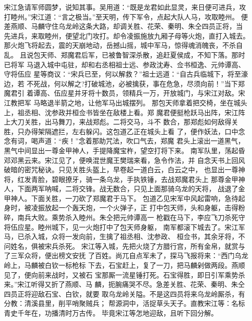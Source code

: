 宋江急请军师圆梦，说知其事。吴用道：“既是龙君如此显灵，来日便可进兵，攻
打睦州。”宋江道：“言之极当。”至天明，传下军令，点起大队人马，攻取睦州。
便差燕顺、马麟守住乌龙岭这条大路，却调关胜、花荣、秦明、朱仝四员正将，当
先进兵，来取睦州，便望北门攻打。却令凌振施放九厢子母等火炮，直打入城去。
那火炮飞将起去，震的天崩地动，岳撼山摇，城中军马，惊得魂消魄丧，不杀自乱。
且说包天师、郑魔君后军，已被鲁智深杀散，追赶夏侯成，不知下落。那时已将军
马退入城中屯驻，却和右丞相祖士远、参政沈寿、佥书桓逸、元帅谭高、守将伍应
星等商议：“宋兵已至，何以解救？”祖士远道：“自古兵临城下，将至濠边，若
不死战，何以解之?打破城池，必被擒获，事在危急，尽须向前！”当下郑魔君引
着谭高、伍应星并牙将十数员，领精兵一万，开放城门，与宋江对敌。宋江教把军
马略退半箭之地，让他军马出城摆列。
那包天师拿着把交椅，坐在城头上，祖丞相、沈参政并桓佥书皆坐在敌楼上看。郑
魔君便挺枪跃马出阵，宋江阵上大刀关胜，出马舞刀，来战郑彪。二将交马，斗不
数合，那郑彪如何敌得关胜，只办得架隔遮拦，左右躲闪。这包道乙正在城头上看
了，便作妖法，口中念念有词，喝声道：“疾！”念着那助咒法，吹口气去，郑魔
君头上滚出一道黑气，黑气中间显出一尊金甲神人，手提降魔宝杵，望空打将下来。
南军队里，荡起昏邓邓黑云来。宋江见了，便唤混世魔王樊瑞来看，急令作法，并
自念天书上回风破暗的密咒秘诀。只见关胜头盔上，早卷起一道白云，白云之中，
也显出一尊神将，红发青脸，碧眼撩牙，骑一条乌龙，手执铁锤，去战郑魔君头上
那尊金甲神人，下面两军呐喊，二将交锋。战无数合，只见上面那骑乌龙的天将，
战退了金甲神人。下面关胜，一刀砍了郑魔君于马下。
包道乙见宋军中风起雷响，急待起身时，被凌振放起一个轰天炮，一个火弹子，正
打中包天师，头和身躯，击得粉碎，南兵大败。乘势杀入睦州。朱仝把元帅谭高一
枪戳在马下，李应飞刀杀死守将伍应星。睦州城下，见一火炮打中了包天师身躯，
南军都滚下城去了。宋江军马，已杀入城，众将一发向前，生擒了祖丞相、沈参政、
桓佥书，其余牙将，不问姓名，俱被宋兵杀死。
宋江等入城，先把火烧了方腊行宫，所有金帛，就赏与了三军众将，便出榜文安抚
了百姓。尚兀自点军未了，探马飞报将来：“西门乌龙岭上，马麟被白钦一标枪标
下去，石宝赶上，复了一刀，把马麟剁做两段。燕顺见了，便向前来战时，又被石
宝那厮一流星锤打死。石宝得胜，即日引军乘势杀来。”宋江听得又折了燕顺、马
麟，扼腕痛哭不尽。急差关胜、花荣、秦明、朱仝四员正将迎敌石宝、白钦，就要
取乌龙岭关隘。不是这四员将来乌龙岭厮杀，有分教：清溪县里，削平哨聚贼兵；
帮源洞中，活捉草头天子。直教宋江等：名标青史千年在，功播清时万古传。
毕竟宋江等怎地迎敌，且听下回分解。